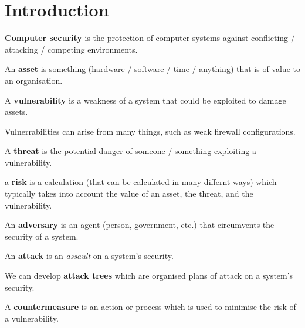 \chapter{Introduction}

\begin{definition}
    \textbf{Computer security} is the protection of computer systems against conflicting / attacking / competing environments. 
\end{definition}

\begin{definition}[Asset]
    An \textbf{asset} is something (hardware / software / time / anything) that is of value to an organisation. 
\end{definition}

\begin{definition}[Vulnerability]
    A \textbf{vulnerability} is a weakness of a system that could be exploited to damage assets.
\end{definition}

Vulnerrabilities can arise from many things, such as weak firewall configurations.

\begin{definition}[Threat]
    A \textbf{threat} is the potential danger of someone / something exploiting a vulnerability.
\end{definition}

\begin{definition}[Risk]
    a \textbf{risk} is a calculation (that can be calculated in many differnt ways) which typically takes into account the value of an asset, the threat, and the vulnerability.
\end{definition}

\begin{definition}[Adversaries]
    An \textbf{adversary} is an agent (person, government, etc.) that circumvents the security of a system.
\end{definition}

\begin{definition}[Attack]
    An \textbf{attack} is an \emph{assault} on a system's security.
\end{definition}

We can develop \textbf{attack trees} which are organised plans of attack on a system's security.

\begin{definition}[Countermeasure]
   A \textbf{countermeasure} is an action or process which is used to minimise the risk of a vulnerability. 
\end{definition}

